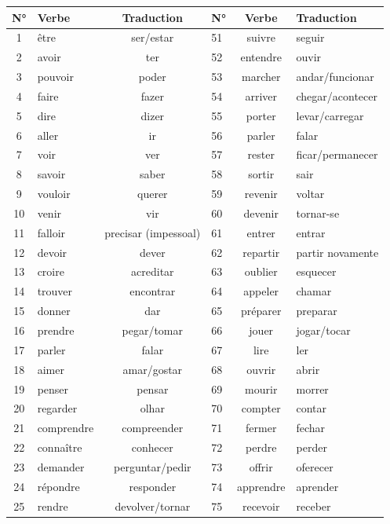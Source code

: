 \documentclass[a4paper,12pt]{article}
\begin{document}
\begin{longtable}{c l c l c l}
    \toprule
    N° & Verbe & Traduction & N° & Verbe & Traduction \\
    \midrule
    1 & être & ser/estar & 51 & suivre & seguir \\
    2 & avoir & ter & 52 & entendre & ouvir \\
    3 & pouvoir & poder & 53 & marcher & andar/funcionar \\
    4 & faire & fazer & 54 & arriver & chegar/acontecer \\
    5 & dire & dizer & 55 & porter & levar/carregar \\
    6 & aller & ir & 56 & parler & falar \\
    7 & voir & ver & 57 & rester & ficar/permanecer \\
    8 & savoir & saber & 58 & sortir & sair \\
    9 & vouloir & querer & 59 & revenir & voltar \\
    10 & venir & vir & 60 & devenir & tornar-se \\
    11 & falloir & precisar (impessoal) & 61 & entrer & entrar \\
    12 & devoir & dever & 62 & repartir & partir novamente \\
    13 & croire & acreditar & 63 & oublier & esquecer \\
    14 & trouver & encontrar & 64 & appeler & chamar \\
    15 & donner & dar & 65 & préparer & preparar \\
    16 & prendre & pegar/tomar & 66 & jouer & jogar/tocar \\
    17 & parler & falar & 67 & lire & ler \\
    18 & aimer & amar/gostar & 68 & ouvrir & abrir \\
    19 & penser & pensar & 69 & mourir & morrer \\
    20 & regarder & olhar & 70 & compter & contar \\
    21 & comprendre & compreender & 71 & fermer & fechar \\
    22 & connaître & conhecer & 72 & perdre & perder \\
    23 & demander & perguntar/pedir & 73 & offrir & oferecer \\
    24 & répondre & responder & 74 & apprendre & aprender \\
    25 & rendre & devolver/tornar & 75 & recevoir & receber \\

\end{longtable}
\end{document}
